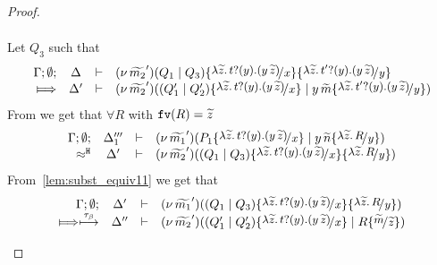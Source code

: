 \begin{proof}
\begin{enumerate}
\[\begin{array}{crll}
		\end{array}
	\]
%
%
	Let $Q_3$ such that
	\[
		\mhorel{\Gamma}{\Delta}{\newsp{\widetilde{m_2}'}{Q_1 \Par Q_3} \subst{\auxtr{t}}{x} \subst{\auxtr{t'}}{y}}
		{\Hby{}}
		{\Delta'}{}{\newsp{\widetilde{m_2}'}{(Q_1' \Par Q_2') \subst{\auxtr{t}}{x} \Par \appl{y}{\widetilde{m}} \subst{\auxtr{t'}}{y}}}
	\]
%
	\noi From  we get that $\forall R$ with $\mathtt{fv}(R) = \widetilde{z}$
%
	\begin{eqnarray*}
		\mhorel{\Gamma}{\Delta_1'''}{\newsp{\widetilde{m_1}'}{P_1 \subst{\auxtr{t}}{x} \Par \appl{y}{\widetilde{n}} \subst{\abs{\widetilde{z}}{R}}{y}}}
		{\hwb}
		{\Delta'}{}{\newsp{\widetilde{m_2}'}{(Q_1 \Par Q_3) \subst{\auxtr{t}}{x} \subst{\abs{\widetilde{z}}{R}}{y}}}
	\end{eqnarray*}
%
	\noi From~\eqref{lem:subst_equiv11} we get that
\[
	\mhorel{\Gamma}{\Delta'}{\newsp{\widetilde{m_1}'}{(Q_1 \Par Q_3) \subst{\auxtr{t}}{x} \subst{\abs{\widetilde{z}}{R}}{y}}}
	{\Hby{} \hby{\btau}}
	{\Delta''}{}{\newsp{\widetilde{m_2}'}{(Q_1' \Par Q_2') \subst{\auxtr{t}}{x} \Par R \subst{\widetilde{m}}{\widetilde{z}}}}%
\]
\end{enumerate}
\end{proof}
